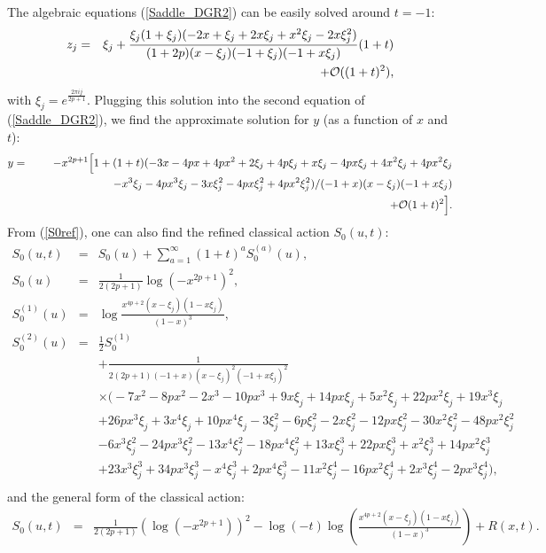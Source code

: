 \documentclass[hyper,letterpaper]{JHEP3}
\begin{document}
The algebraic equations (\ref{Saddle_DGR2}) can be easily solved around $t=-1$:
\begin{eqnarray}
z_j&=&\xi_j+\frac{\xi_j(1+\xi_j)(-2 x + \xi_j + 2 x \xi_j + x^2 \xi_j - 2 x \xi_j^2)}{(1 + 2 p) (x - \xi_j) (-1 + \xi_j) (-1 + x \xi_j)}(1+t)
\nonumber \\
&&+{\cal O}((1+t)^2),
\end{eqnarray}
with $\xi_j=e^{\frac{2\pi ij}{2p+1}}$.
Plugging this solution into the second equation of (\ref{Saddle_DGR2}),
we find the approximate solution for $y$ (as a function of $x$ and $t$):
\begin{eqnarray}
y&=&-x^{2p+1}\Bigl[
1+(1+t)
(-3 x - 4 p x + 4 p x^2 + 2 \xi_j + 4 p \xi_j + x \xi_j -
 4 p x \xi_j + 4 x^2 \xi_j + 4 p x^2 \xi_j
\nonumber \\
&&\quad\quad\quad\quad\quad\quad\quad
- x^3 \xi_j -
 4 p x^3 \xi_j - 3 x \xi_j^2 - 4 p x \xi_j^2 + 4 p x^2 \xi_j^2)
/(-1 + x) (x - \xi_j) (-1 + x \xi_j)
\nonumber \\
&&\quad\quad\quad\quad
+{\cal O}(1+t)^2\Bigr].
\end{eqnarray}
{}From (\ref{S0ref}), one can also find the refined classical action $S_0(u,t)$:
\begin{eqnarray}
S_0(u,t)&=&S_0(u)+\sum_{a=1}^{\infty}(1+t)^aS_0^{(a)}(u),
\nonumber \\
S_0(u)&=&\frac{1}{2(2p+1)}\log(-x^{2p+1})^2,
\nonumber \\
S_0^{(1)}(u)&=&\log\frac{x^{4p+2}(x-\xi_j)(1-x\xi_j)}{(1-x)^3},
\nonumber \\
S_0^{(2)}(u)&=&\frac{1}{2}S_0^{(1)}
\nonumber \\
&&
+\frac{1}{2(2p+1)(-1 + x) (x - \xi_j)^2 (-1 + x \xi_j)^2}
\nonumber \\
&&\times\bigl(
-7 x^2 - 8 p x^2 - 2 x^3 - 10 p x^3 + 9 x \xi_j + 14 p x \xi_j +
 5 x^2 \xi_j + 22 p x^2 \xi_j + 19 x^3 \xi_j
\nonumber \\
&&
+ 26 p x^3 \xi_j +
 3 x^4 \xi_j + 10 p x^4 \xi_j - 3 \xi_j^2 - 6 p \xi_j^2 -
 2 x \xi_j^2 - 12 p x \xi_j^2 - 30 x^2 \xi_j^2 - 48 p x^2 \xi_j^2
\nonumber \\
&&
-
 6 x^3 \xi_j^2 - 24 p x^3 \xi_j^2 - 13 x^4 \xi_j^2 -
 18 p x^4 \xi_j^2 + 13 x \xi_j^3 + 22 p x \xi_j^3 + x^2 \xi_j^3 +
 14 p x^2 \xi_j^3
\nonumber \\
&&
+ 23 x^3 \xi_j^3 + 34 p x^3 \xi_j^3 - x^4 \xi_j^3 +
 2 p x^4 \xi_j^3 - 11 x^2 \xi_j^4 - 16 p x^2 \xi_j^4 +
 2 x^3 \xi_j^4 - 2 p x^3 \xi_j^4
\bigr),
\nonumber
\\
&&
\end{eqnarray}
and the general form of the classical action:
\begin{eqnarray}
S_0(u,t)&=&\frac{1}{2(2p+1)}\left(\log(-x^{2p+1})\right)^2-\log(-t)
 \log\left(\frac{x^{4p+2}(x-\xi_j)(1-x\xi_j)}{(1-x)^3}\right)+R(x,t).
\nonumber \\
&&
\end{eqnarray}
\end{document}

